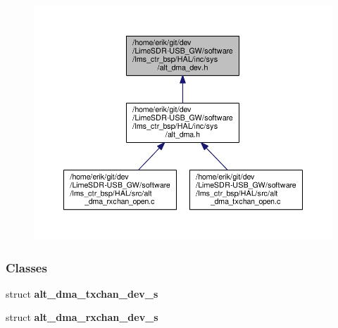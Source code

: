 \begin{figure}[H]
\begin{center}
\leavevmode
\includegraphics[width=350pt]{df/d7b/alt__dma__dev_8h__dep__incl}
\end{center}
\end{figure}
\subsubsection*{Classes}
\begin{DoxyCompactItemize}
\item 
struct {\bf alt\+\_\+dma\+\_\+txchan\+\_\+dev\+\_\+s}
\item 
struct {\bf alt\+\_\+dma\+\_\+rxchan\+\_\+dev\+\_\+s}
\end{DoxyCompactItemize}
